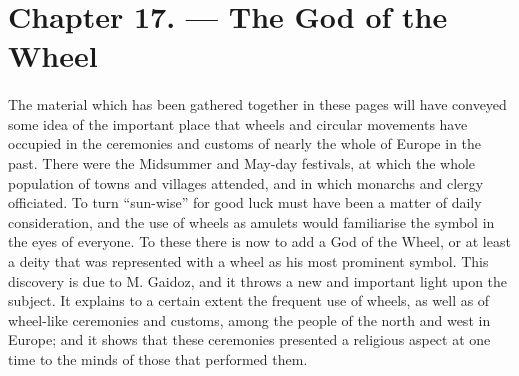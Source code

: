\documentclass[a4paper, 11pt, oneside, polutonikogreek, english]{article}
\begin{document}
\section{Chapter 17. --- The God of the Wheel}
\paragraph{}
The material which has been gathered together in these pages will have conveyed some idea of the important place that wheels and circular movements have occupied in the ceremonies and customs of nearly the whole of Europe in the past. There were the Midsummer and May-day festivals, at which the whole population of towns and villages attended, and in which monarchs and clergy officiated. To turn ``sun-wise'' for good luck must have been a matter of daily consideration, and the use of wheels as amulets would familiarise the symbol in the eyes of everyone. To these there is now to add a God of the Wheel, or at least a deity that was represented with a wheel as his most prominent symbol. This discovery is due to M. Gaidoz, and it throws a new and important light upon the subject. It explains to a certain extent the frequent use of wheels, as well as of wheel-like ceremonies and customs, among the people of the north and west in Europe; and it shows that these ceremonies presented a religious aspect at one time to the minds of those that performed them.
\end{document}
